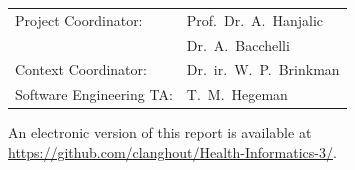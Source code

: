 \begin{titlepage}
\begin{center}
\vfill

\begin{tabular}{ll}
    Project Coordinator: & Prof.\ Dr.\ A.\ Hanjalic\\
    	& Dr.\ A.\ Bacchelli\\
    Context Coordinator:
        & Dr.\ ir.\ W.\ P.\ Brinkman \\
    Software Engineering TA: & T.\ M.\ Hegeman
\end{tabular}

\bigskip
\bigskip

\bigskip
\bigskip
An electronic version of this report is available at \url{https://github.com/clanghout/Health-Informatics-3/}.

\end{center}

\end{titlepage}

